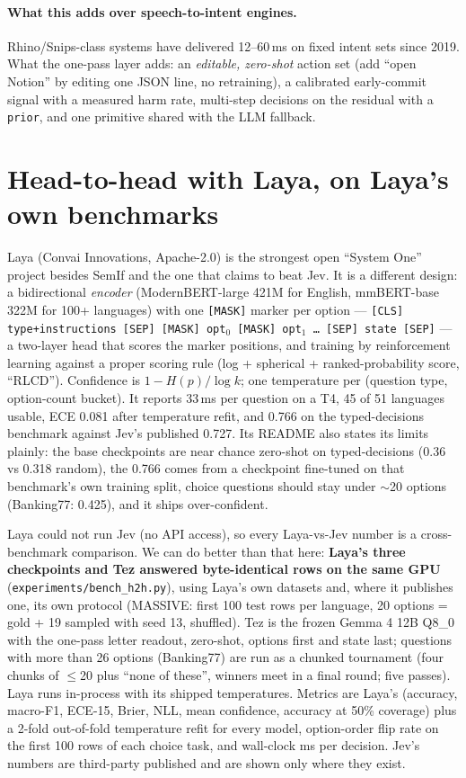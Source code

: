 \documentclass[11pt,a4paper]{article}
\newcommand{\code}[1]{\texttt{#1}}
\begin{document}
\paragraph{What this adds over speech-to-intent engines.} Rhino/Snips-class systems have delivered 12--60\,ms on fixed intent sets since 2019. What the one-pass layer adds: an \emph{editable, zero-shot} action set (add ``open Notion'' by editing one JSON line, no retraining), a calibrated early-commit signal with a measured harm rate, multi-step decisions on the residual with a \code{prior}, and one primitive shared with the LLM fallback.

\section{Head-to-head with Laya, on Laya's own benchmarks}
\label{sec:laya}

Laya (Convai Innovations, Apache-2.0) is the strongest open ``System One'' project besides SemIf and the one that claims to beat Jev. It is a different design: a bidirectional \emph{encoder} (ModernBERT-large 421M for English, mmBERT-base 322M for 100+ languages) with one \code{[MASK]} marker per option --- \code{[CLS] type+instructions [SEP] [MASK] opt$_0$ [MASK] opt$_1$ \ldots\ [SEP] state [SEP]} --- a two-layer head that scores the marker positions, and training by reinforcement learning against a proper scoring rule (log + spherical + ranked-probability score, ``RLCD''). Confidence is $1-H(p)/\log k$; one temperature per (question type, option-count bucket). It reports 33\,ms per question on a T4, 45 of 51 languages usable, ECE 0.081 after temperature refit, and 0.766 on the typed-decisions benchmark against Jev's published 0.727. Its README also states its limits plainly: the base checkpoints are near chance zero-shot on typed-decisions (0.36 vs 0.318 random), the 0.766 comes from a checkpoint fine-tuned on that benchmark's own training split, choice questions should stay under $\sim$20 options (Banking77: 0.425), and it ships over-confident.

Laya could not run Jev (no API access), so every Laya-vs-Jev number is a cross-benchmark comparison. We can do better than that here: \textbf{Laya's three checkpoints and Tez answered byte-identical rows on the same GPU} (\code{experiments/bench\_h2h.py}), using Laya's own datasets and, where it publishes one, its own protocol (MASSIVE: first 100 test rows per language, 20 options = gold + 19 sampled with seed 13, shuffled). Tez is the frozen Gemma 4 12B Q8\_0 with the one-pass letter readout, zero-shot, options first and state last; questions with more than 26 options (Banking77) are run as a chunked tournament (four chunks of $\le$20 plus ``none of these'', winners meet in a final round; five passes). Laya runs in-process with its shipped temperatures. Metrics are Laya's (accuracy, macro-F1, ECE-15, Brier, NLL, mean confidence, accuracy at 50\% coverage) plus a 2-fold out-of-fold temperature refit for every model, option-order flip rate on the first 100 rows of each choice task, and wall-clock ms per decision. Jev's numbers are third-party published and are shown only where they exist.
\end{document}
